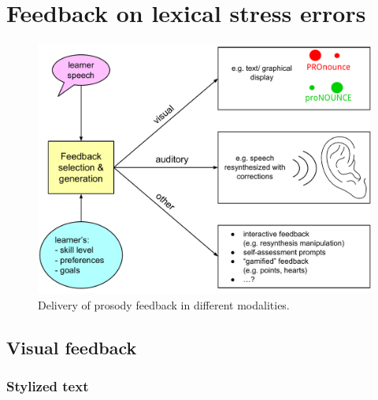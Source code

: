 %
%
\chapter{Feedback on lexical stress errors}
\label{chap:feedback}


 	\citep{Hattie2007}


\begin{figure}[htb]
		\includegraphics[width=\textwidth]{../img/feedback}
		\caption{Delivery of prosody feedback in different modalities.}
		\label{fig:feedback}
	\end{figure}

%


\section{Visual feedback}
\label{sec:fb:visual}

	\subsection{Stylized text}
	\label{sec:visual:text}
	

